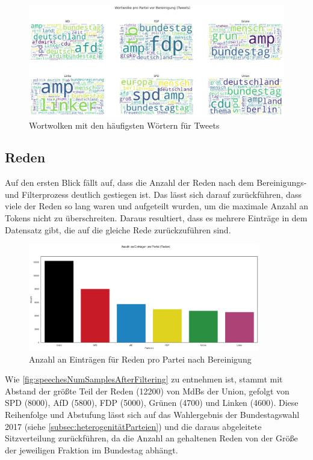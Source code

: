 
\begin{figure}[H]
    \centering
    \includegraphics[width=\linewidth]{data/images/tweets/wortwolke_pro_partei_vor_bereinigung.png}
    \caption{Wortwolken mit den häufigsten Wörtern für Tweets} \label{fig:tweetsWordclouds}
\end{figure}

\subsection*{Reden}

Auf den ersten Blick fällt auf, dass die Anzahl der Reden nach dem Bereinigungs- und Filterprozess deutlich gestiegen ist. Das lässt sich darauf zurückführen, dass viele der Reden so lang waren und aufgeteilt wurden, um die maximale Anzahl an Tokens nicht zu überschreiten. Daraus resultiert, dass es mehrere Einträge in dem Datensatz gibt, die auf die gleiche Rede zurückzuführen sind.

\begin{figure}[H]
    \centering
    \includegraphics[width=0.9\textwidth]{data/images/speeches/speeches_num_samples_after_filter.png}
    \caption{Anzahl an Einträgen für Reden pro Partei nach Bereinigung} \label{fig:speechesNumSamplesAfterFiltering}
\end{figure}

Wie \autoref{fig:speechesNumSamplesAfterFiltering} zu entnehmen ist, stammt mit Abstand der größte Teil der Reden (\num{12200}) von \acp{MdB} der Union, gefolgt von \ac{SPD} (\num{8000}), \ac{AfD} (\num{5800}), \ac{FDP} (\num{5000}), Grünen (\num{4700}) und Linken (\num{4600}). Diese Reihenfolge und Abstufung lässt sich auf das Wahlergebnis der Bundestagswahl \num{2017} (siehe \autoref{subsec:heterogenitätParteien}) und die daraus abgeleitete Sitzverteilung zurückführen, da die Anzahl an gehaltenen Reden von der Größe der jeweiligen Fraktion im Bundestag abhängt.

